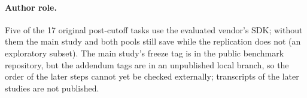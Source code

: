 \documentclass[11pt]{article}
\begin{document}
\paragraph{Author role.} Five of the 17 original post-cutoff tasks use the evaluated vendor's SDK; without them the main study and both pools still save while the replication does not (an exploratory subset). The main study's freeze tag is in the public benchmark repository, but the addendum tags are in an unpublished local branch, so the order of the later steps cannot yet be checked externally; transcripts of the later studies are not published.
\end{document}
